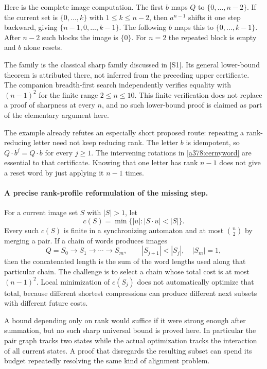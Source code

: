 \documentclass[11pt]{article}
\begin{document}
Here is the complete image computation. The first $b$ maps $Q$ to $\{0,\ldots,n-2\}$. If the current set is $\{0,\ldots,k\}$ with $1\leq k\leq n-2$, then $a^{n-1}$ shifts it one step backward, giving $\{n-1,0,\ldots,k-1\}$. The following $b$ maps this to $\{0,\ldots,k-1\}$. After $n-2$ such blocks the image is $\{0\}$. For $n=2$ the repeated block is empty and $b$ alone resets.

The family is the classical sharp family discussed in [S1]. Its general lower-bound theorem is attributed there, not inferred from the preceding upper certificate. The companion breadth-first search independently verifies equality with $(n-1)^2$ for the finite range $2\leq n\leq10$. This finite verification does not replace a proof of sharpness at every $n$, and no such lower-bound proof is claimed as part of the elementary argument here.

The example already refutes an especially short proposed route: repeating a rank-reducing letter need not keep reducing rank. The letter $b$ is idempotent, so $Q\cdot b^j=Q\cdot b$ for every $j\geq1$. The intervening rotations in \eqref{a378:cernyword} are essential to that certificate. Knowing that one letter has rank $n-1$ does not give a reset word by just applying it $n-1$ times.

\paragraph{A precise rank-profile reformulation of the missing step.}
For a current image set $S$ with $|S|>1$, let
\[
 c(S)=\min\{|u|:|S\cdot u|<|S|\}.
\]
Every such $c(S)$ is finite in a synchronizing automaton and at most $\binom n2$ by merging a pair. If a chain of words produces images
\[
 Q=S_0\longrightarrow S_1\longrightarrow\cdots\longrightarrow S_m,
 \qquad |S_{j+1}|<|S_j|,\quad |S_m|=1,
\]
then the concatenated length is the sum of the word lengths used along that particular chain. The challenge is to select a chain whose total cost is at most $(n-1)^2$. Local minimization of $c(S_j)$ does not automatically optimize that total, because different shortest compressions can produce different next subsets with different future costs.

A bound depending only on rank would suffice if it were strong enough after summation, but no such sharp universal bound is proved here. In particular the pair graph tracks two states while the actual optimization tracks the interaction of all current states. A proof that disregards the resulting subset can spend its budget repeatedly resolving the same kind of alignment problem.
\end{document}
